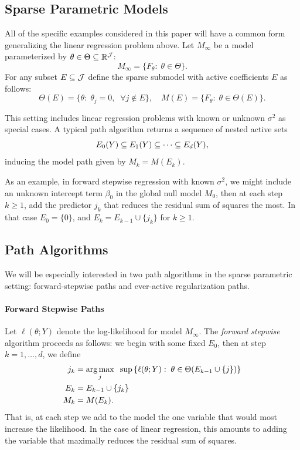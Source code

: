 \documentclass{article}
\begin{document}
\subsection{Sparse Parametric Models}\label{sec:genSparse}

All of the specific examples considered in this paper will have a common form generalizing the linear regression problem above. Let $M_\infty$ be a model parameterized by $\theta\in \Theta \subseteq \mathbb{R}^{\mathcal{J}}$:
\[
M_\infty = \{F_\theta:\; \theta \in \Theta\}.
\]
For any subset $E\subseteq \mathcal{J}$ define the sparse submodel with active coefficients $E$ as follows:
\[
\Theta(E) = \{\theta:\; \theta_j = 0, \;\;\forall j \notin E\}, 
\quad M(E) = \{F_\theta:\; \theta\in \Theta(E)\}.
\]

This setting includes linear regression problems with known or unknown $\sigma^2$ as special cases. A typical path algorithm returns a sequence of nested active sets 
\[
E_0(Y) \subseteq E_1(Y) \subseteq \cdots \subseteq E_d(Y),
\]
inducing the model path given by $M_k = M(E_k)$. 

As an example, in forward stepwise regression with known $\sigma^2$, we might include an unknown intercept term $\beta_0$ in the global null model $M_0$, then at each step $k\geq 1$, add the predictor $j_k$ that reduces the residual sum of squares the most. In that case $E_0 = \{0\}$, and $E_k = E_{k-1} \cup \{j_k\}$ for $k\geq 1$.

\subsection{Path Algorithms}

We will be especially interested in two path algorithms in the sparse parametric setting: forward-stepwise paths and ever-active regularization paths.

\paragraph{Forward Stepwise Paths}
Let $\ell(\theta; Y)$ denote the log-likelihood for model
$M_\infty$. The {\em forward stepwise} algorithm proceeds as follows: we begin with some fixed $E_0$, then at step $k=1,\ldots,d$, we define
\begin{align}\label{eq:forwardDef_start}
j_k &= \operatorname*{arg\,max}_j \;\;\sup \left\{\ell(\theta; Y):\; \theta\in\Theta(E_{k-1} \cup \{j\})\right\} \\
E_k &= E_{k-1} \cup \{j_k\}\\\label{eq:forwardDef_end}
M_k &= M(E_k).
\end{align}
That is, at each step we add to the model the one variable that would most increase the likelihood. In the case of linear regression, this amounts to adding the variable that maximally reduces the residual sum of squares. 
\end{document}
